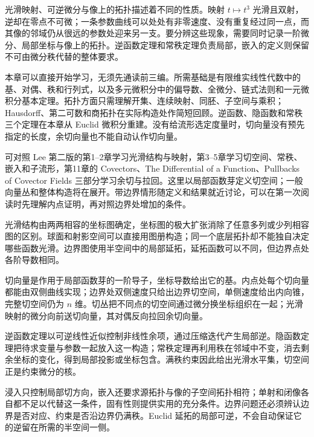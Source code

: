 \ProseParagraphBreak

光滑映射、可逆微分与像上的拓扑描述着不同的性质。映射 \(t\mapsto t^3\) 光滑且双射，逆却在零点不可微；一条参数曲线可以处处有非零速度、没有重复经过同一点，而其像的邻域仍从很远的参数处迎来另一支。要分辨这些现象，需要同时记录一阶微分、局部坐标与像上的拓扑。逆函数定理和常秩定理负责局部，嵌入的定义则保留不可由微分秩代替的整体要求。

\ProseParagraphBreak

本章可以直接开始学习，无须先通读前三编。所需基础是有限维实线性代数中的基、对偶、秩和行列式，以及多元微积分中的偏导数、全微分、链式法则和一元微积分基本定理。拓扑方面只需理解开集、连续映射、同胚、子空间与乘积；Hausdorff、第二可数和商拓扑在实际构造处作简短回顾。逆函数、隐函数和常秩三个定理在本章从 Euclid 微积分重建。没有给流形选定度量时，切向量没有预先指定的长度，余切向量也不能自动认作切向量。

\ProseParagraphBreak

可对照 Lee 第二版的第1--2章学习光滑结构与映射，第3--5章学习切空间、常秩、嵌入和子流形，第11章的 Covectors、The Differential of a Function、Pullbacks of Covector Fields 三部分学习余切与拉回\cite[第1--5章及第11章，第272--286页]{Lee2012Smooth}。这里以局部函数芽定义切空间；一般向量丛和整体构造将在展开。带边界情形随定义和结果就近讨论，可以在第一次阅读时先理解内点证明，再对照边界处增加的条件。






\begin{chaptersummary}
	光滑结构由两两相容的坐标图确定，坐标图的极大扩张消除了任意多列或少列相容图的区别。球面和射影空间可以直接用图册构造；同一个底层拓扑却不能独自决定哪些函数光滑。边界图使用半空间中的局部延拓，延拓函数可以不同，但边界点处各阶导数相同。

	\ProseParagraphBreak

	切向量是作用于局部函数芽的一阶导子，坐标导数给出它的基。内点处每个切向量都能由双侧曲线实现；边界处双侧速度只给出边界切空间，单侧速度给出内向锥，完整切空间仍为 \(n\) 维。切丛把不同点的切空间通过微分换坐标组织在一起；光滑映射的微分向前送切向量，其对偶反向拉回余切向量。

	\ProseParagraphBreak

	逆函数定理以可逆线性近似控制非线性余项，通过压缩迭代产生局部逆。隐函数定理把待求变量与参数一起放入这一构造；常秩定理再利用秩在邻域中不变，消去剩余坐标的变化，得到局部投影或坐标包含。满秩约束因此给出光滑水平集，切空间正是约束微分的核。

	\ProseParagraphBreak

	浸入只控制局部切方向，嵌入还要求源拓扑与像的子空间拓扑相符；单射和闭像各自都不足以代替这一条件，固有性则提供实用的充分条件。边界问题还必须辨认边界是否对应、约束是否沿边界仍满秩。Euclid 延拓的局部可逆，不会自动保证它的逆留在所需的半空间一侧。
\end{chaptersummary}

